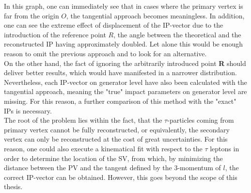 In this graph, one can immediately see that in cases where the primary vertex is far from the origin $O$, the tangential approach becomes meaningless. In addition, one can see the extreme effect of displacement of the IP-vector due to the introduction of the reference point $R$, the angle between the theoretical and the reconstructed IP having approximately doubled. Let alone this would be enough reason to omit the previous approach and to look for an alternative.\\
On the other hand, the fact of ignoring the arbitrarily introduced point \textbf{R} should deliver better results, which would have manifested in a narrower distribution. Nevertheless, each IP-vector on generator level have also been calculated with the tangential approach, meaning the "true" impact parameters on generator level are missing. For this reason, a further comparison of this method with the "exact" IPs is necessary.\\
The root of the problem lies within the fact, that the $\tau$-particles coming from primary vertex cannot be fully reconstructed, or equivalently, the secondary vertex can only be reconstructed at the cost of great uncertainties. For this reason, one could also execute a kinematical fit with respect to the $\tau$ leptons in order to determine the location of the SV, from which, by minimizing the distance between the PV and the tangent defined by the 3-momentum of $l$, the correct IP-vector can be obtained. However, this goes beyond the scope of this thesis.